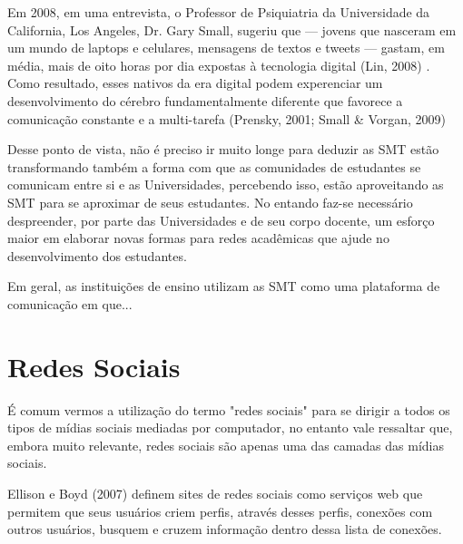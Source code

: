 Em 2008, em uma entrevista, o Professor de Psiquiatria da Universidade da California,
Los Angeles, Dr. Gary Small, sugeriu que — jovens que nasceram em um mundo de laptops
e celulares, mensagens de textos e tweets — gastam, em média, mais de oito horas
por dia expostas à tecnologia digital (Lin, 2008)
. Como resultado,
esses nativos da era digital podem experenciar um desenvolvimento do cérebro
fundamentalmente diferente que favorece a comunicação constante e a multi-tarefa
(Prensky, 2001; Small \& Vorgan, 2009)

Desse ponto de vista, não é preciso ir muito longe para deduzir as SMT estão
transformando também a forma com que as comunidades de estudantes se comunicam
entre si e as Universidades, percebendo isso, estão aproveitando as SMT para
se aproximar de seus estudantes. No entando faz-se necessário despreender, por
parte das Universidades e de seu corpo docente, um esforço maior em elaborar
novas formas para redes acadêmicas que ajude no desenvolvimento dos estudantes.

Em geral, as instituições de ensino utilizam as SMT como uma plataforma de
comunicação em que... 

\section{Redes Sociais}

É comum vermos a utilização do termo "redes sociais" para se dirigir a todos os
tipos de mídias sociais mediadas por computador, no entanto vale ressaltar que,
embora muito relevante, redes sociais são apenas uma das camadas das mídias sociais.

Ellison e Boyd (2007) \cite{beer2008} definem sites de redes sociais como
serviços web que permitem que seus usuários criem perfis, através desses perfis,
conexões com outros usuários, busquem e cruzem informação dentro dessa lista de
conexões.

